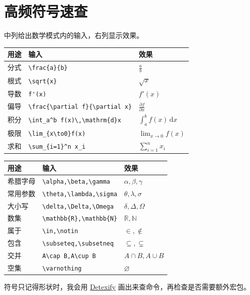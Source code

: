 \documentclass[UTF8,11pt,a4paper,oneside,openany,linespread=1]{ctexbook}
\numberwithin{equation}{chapter}
\begin{document}
\section{高频符号速查}
中列给出数学模式内的输入，右列显示效果。
\begin{center}
\begin{tabular}{lll}
\toprule
用途 & 输入 & 效果 \\
\midrule
分式 & \verb|\frac{a}{b}| & \(\frac ab\) \\
根式 & \verb|\sqrt{x}| & \(\sqrt{x}\) \\
导数 & \verb|f'(x)| & \(f'(x)\) \\
偏导 & \verb|\frac{\partial f}{\partial x}| & \(\frac{\partial f}{\partial x}\) \\
积分 & \verb|\int_a^b f(x)\,\mathrm{d}x| & \(\int_a^b f(x)\,\mathrm{d}x\) \\
极限 & \verb|\lim_{x\to0}f(x)| & \(\lim_{x\to0}f(x)\) \\
求和 & \verb|\sum_{i=1}^n x_i| & \(\sum_{i=1}^n x_i\) \\
\bottomrule
\end{tabular}
\end{center}
\begin{center}
\begin{tabular}{lll}
\toprule
用途 & 输入 & 效果 \\
\midrule
希腊字母 & \verb|\alpha,\beta,\gamma| & \(\alpha,\beta,\gamma\) \\
常用参数 & \verb|\theta,\lambda,\sigma| & \(\theta,\lambda,\sigma\) \\
大小写 & \verb|\delta,\Delta,\Omega| & \(\delta,\Delta,\Omega\) \\
数集 & \verb|\mathbb{R},\mathbb{N}| & \(\mathbb{R},\mathbb{N}\) \\
属于 & \verb|\in,\notin| & \(\in,\notin\) \\
包含 & \verb|\subseteq,\subsetneq| & \(\subseteq,\subsetneq\) \\
交并 & \verb|A\cap B,A\cup B| & \(A\cap B,A\cup B\) \\
空集 & \verb|\varnothing| & \(\varnothing\) \\
\bottomrule
\end{tabular}
\end{center}
符号只记得形状时，我会用 \href{https://detexify.kirelabs.org/}{Detexify}
画出来查命令，再检查是否需要额外宏包。
\end{document}
